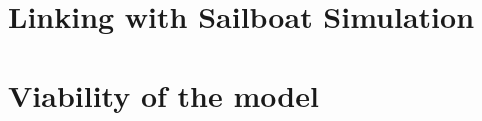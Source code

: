 \documentclass[twoside,11pt]{report} %
\begin{document}
\chapter{Linking with Sailboat Simulation}


\chapter{Viability of the model}



%


\nocite{*}


\end{document}
